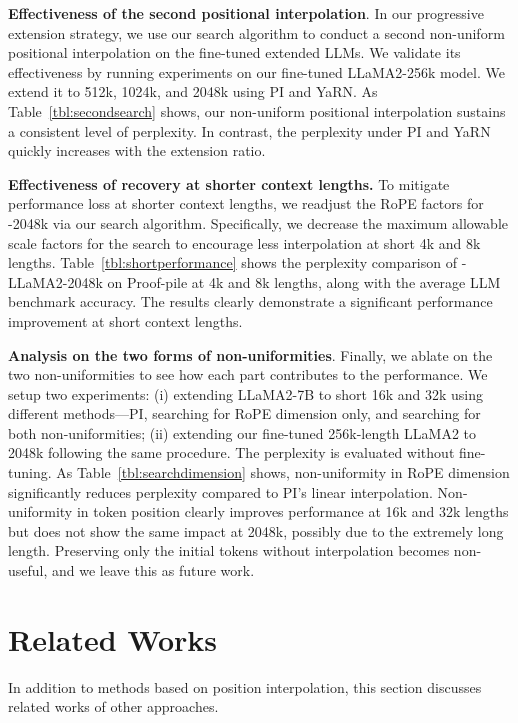 \documentclass{article}
\theoremstyle{plain}
\theoremstyle{definition}
\theoremstyle{remark}
\begin{document}
\noindent\textbf{Effectiveness of the second positional interpolation}. In our progressive extension strategy, we use our search algorithm to conduct a second non-uniform positional interpolation on the fine-tuned extended LLMs. We validate its effectiveness by running experiments on our fine-tuned LLaMA2-256k model.  We extend it to 512k, 1024k, and 2048k using PI and YaRN. As Table~\ref{tbl:secondsearch} shows, our non-uniform positional interpolation sustains a consistent level of perplexity.  In contrast, the perplexity under PI and YaRN quickly increases with the extension ratio. 





\noindent\textbf{Effectiveness of recovery at shorter context lengths.} To mitigate performance loss at shorter context lengths, we readjust the RoPE factors for {\sysname}-2048k via our search algorithm. Specifically, we decrease the maximum allowable scale factors for the search to encourage less interpolation at short 4k and 8k lengths. 
 Table~\ref{tbl:shortperformance} shows the perplexity comparison of {\sysname}-LLaMA2-2048k on Proof-pile at 4k and 8k lengths, along with the average LLM benchmark accuracy.  The results clearly demonstrate a significant performance improvement at short context lengths. 








\noindent\textbf{Analysis on the two forms of non-uniformities}. Finally, we ablate on the two non-uniformities to see how each part contributes to the performance. We setup two experiments: (i) extending LLaMA2-7B to short 16k and 32k using different methods—PI, searching for RoPE dimension only, and searching for both non-uniformities; (ii) extending our fine-tuned 256k-length LLaMA2 to 2048k following the same procedure.  The perplexity is evaluated without fine-tuning. 
As Table~\ref{tbl:searchdimension} shows, non-uniformity in RoPE dimension significantly reduces perplexity compared to PI's linear interpolation. Non-uniformity in token position clearly improves performance at 16k and 32k lengths  but does not show the same impact at 2048k, possibly due to the extremely long length. Preserving only the initial tokens without interpolation becomes non-useful, and we leave this as future work.

	
\vspace{-4ex}
\section{Related Works}
\vspace{-1ex}
In addition to methods based on position interpolation, this section discusses related works of other approaches. 
\end{document}
